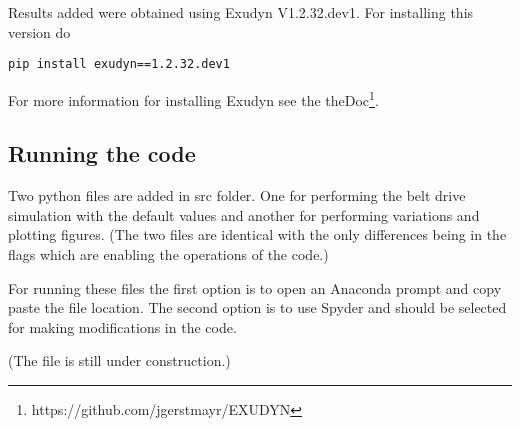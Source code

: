 Results added  
were obtained using Exudyn V1.2.32.dev1. For installing this version do
\bi
  \item[] \texttt{pip install exudyn==1.2.32.dev1}
\ei
             
For more information for installing Exudyn see the theDoc\footnote{https://github.com/jgerstmayr/EXUDYN}.
\subsection{Running the code}
Two python files are added in src folder. One for performing the belt drive simulation with the default values and another for performing variations and plotting figures. (The two files are identical with the only differences being in the flags which are enabling the operations of the code.)
 
For running these files the first option is to open an Anaconda prompt and copy paste the file location.
The second option is to use Spyder and should be selected for making modifications in the code. 



(The file is still under construction.)